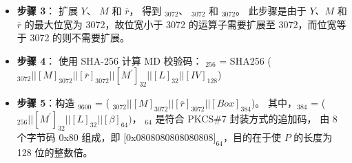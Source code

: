 \documentclass[main\_\_CN.tex]{subfiles}
\begin{document}
\begin{itemize}
    \item {\bfseries 步骤 3}：
          扩展 \begin{math}Y\end{math}、
               \begin{math}M\end{math} 和
               \begin{math}\overline{r}\end{math}，
          得到 \begin{math}[Y]_{3072}\end{math}、
               \begin{math}[M]_{3072}\end{math} 和
               \begin{math}[\overline{r}]_{3072}\end{math}。
          此步骤是由于 \begin{math}Y\end{math}、\begin{math}M\end{math} 和 \begin{math}\overline{r}\end{math} 的最大位宽为 3072，故位宽小于 3072 的运算子需要扩展至 3072，而位宽等于 3072 的则不需要扩展。


    \item {\bfseries 步骤 4}：
            使用 SHA-256 计算 MD 校验码：
                \begin{math}[MD]_{256}\end{math} = SHA256 (\begin{math}
                [Y]_{3072} ||
                [M]_{3072} ||
                [\overline{r}]_{3072} ||
                [M^{\prime}]_{32} ||
                [L]_{32} ||
                [IV]_{128}
            \end{math})

    \item {\bfseries 步骤 5}：构造 \begin{math}[P]_{9600}\end{math} = (
            \begin{math}
                [Y]_{3072} ||
                [M]_{3072} ||
                [\overline{r}]_{3072} ||
                [Box]_{384}
            \end{math})。
            其中，\begin{math}[Box]_{384}\end{math} = (
            \begin{math}
                [MD]_{256} ||
                [M^{\prime}]_{32} ||
                [L]_{32} ||
                [\beta]_{64})
            \end{math}，
            \begin{math}[\beta]_{64} \end{math} 是符合 PKCS\#7 封装方式的追加码， 由 8 个字节码 0x80 组成，即 $[$0x0808080808080808$]_{64}$，目的在于使 \begin{math}P\end{math} 的长度为 128 位的整数倍。


\end{itemize}
\end{document}
